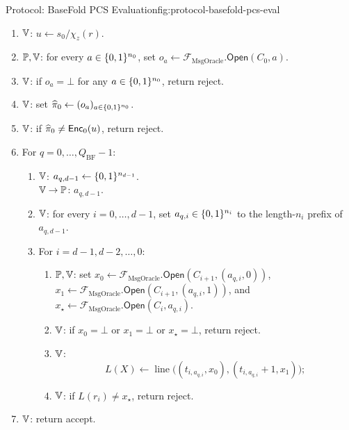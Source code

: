 \begin{protocolbox}{Protocol: BaseFold PCS Evaluation}{fig:protocol-basefold-pcs-eval}
\begin{description}[leftmargin=0.2in,style=nextline,itemsep=0.16em,topsep=0.2em,parsep=0pt]
\begin{enumerate}[leftmargin=0.28in,label=\textbf{O\arabic*.},itemsep=0.08em,topsep=0.1em,parsep=0pt]
          \item \(\mathbb{V}\): \(u\gets s_0/\chi_z(r)\).
          \item \(\mathbb{P},\mathbb{V}\): for every \(a\in\{0,1\}^{n_0}\), set
            \(o_a\gets\mathcal F_{\mathrm{MsgOracle}}.\mathsf{Open}(C_0,a)\).
          \item \(\mathbb{V}\): if \(o_a=\bot\) for any \(a\in\{0,1\}^{n_0}\), return reject.
          \item \(\mathbb{V}\): set \(\widehat\pi_0\gets(o_a)_{a\in\{0,1\}^{n_0}}\).
          \item \(\mathbb{V}\): if \(\widehat\pi_0\ne\mathsf{Enc}_0(u)\), return reject.
          \item For $q=0,\ldots,Q_{\mathrm{BF}}-1$:
            \begin{enumerate}[leftmargin=0.24in,label=\textbf{\alph*.},itemsep=0.06em,topsep=0.06em,parsep=0pt]
              \item \(\mathbb{V}\): \(a_{q,d-1}\leftarrow\{0,1\}^{n_{d-1}}\).\\
                \(\mathbb{V}\to\mathbb{P}\): \(a_{q,d-1}\).
              \item \(\mathbb{V}\): for every \(i=0,\ldots,d-1\), set
                \(a_{q,i}\in\{0,1\}^{n_i}\) to the length-\(n_i\) prefix of
                \(a_{q,d-1}\).
              \item For $i=d-1,d-2,\ldots,0$:
                \begin{enumerate}[leftmargin=0.24in,label=\textbf{\roman*.},itemsep=0.06em,topsep=0.06em,parsep=0pt]
                  \item \(\mathbb{P},\mathbb{V}\): set
                    \(x_0\gets\mathcal F_{\mathrm{MsgOracle}}.\mathsf{Open}(C_{i+1},(a_{q,i},0))\),
                    \(x_1\gets\mathcal F_{\mathrm{MsgOracle}}.\mathsf{Open}(C_{i+1},(a_{q,i},1))\),
                    and \(x_\star\gets\mathcal F_{\mathrm{MsgOracle}}.\mathsf{Open}(C_i,a_{q,i})\).
                  \item \(\mathbb{V}\): if \(x_0=\bot\) or \(x_1=\bot\) or \(x_\star=\bot\), return reject.
                  \item \(\mathbb{V}\):
                    \[
                      L(X)\gets
                      \operatorname{line}\bigl((t_{i,a_{q,i}},x_0),
                      (t_{i,a_{q,i}}+1,x_1)\bigr);
                    \]
                  \item \(\mathbb{V}\): if \(L(r_i)\ne x_\star\), return reject.
                \end{enumerate}
            \end{enumerate}
          \item \(\mathbb{V}\): return accept.
        \end{enumerate}
\end{description}
\end{protocolbox}

